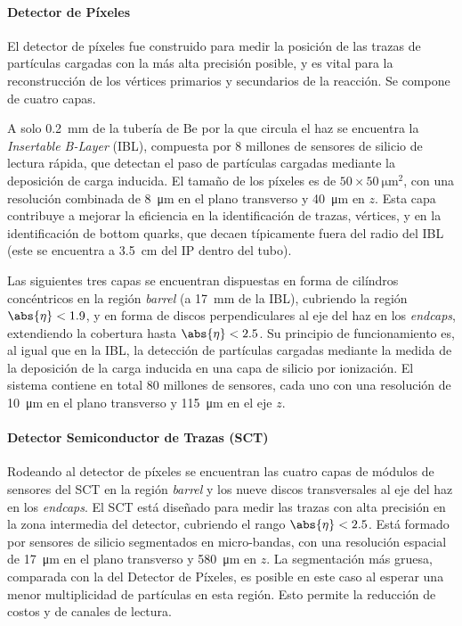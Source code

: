\paragraph{Detector de Píxeles}

El detector de píxeles fue construido para medir la posición de las trazas de partículas cargadas con la más alta precisión posible, y es vital para la reconstrucción de los vértices primarios y secundarios de la reacción. Se compone de cuatro capas.

A solo \SI{0.2}{\milli\meter} de la tubería de $\textrm{Be}$ por la que circula el haz se encuentra la \textit{Insertable B-Layer} (IBL), compuesta por 8 millones de sensores de silicio de lectura rápida, que detectan el paso de partículas cargadas mediante la deposición de carga inducida. El tamaño de los píxeles es de $50 \times \SI{50}{\micro\meter^2}$, con una resolución combinada de \SI{8}{\micro\meter} en el plano transverso y \SI{40}{\micro\meter} en $z$. Esta capa contribuye a mejorar la eficiencia en la identificación de trazas, vértices, y en la identificación de bottom quarks, que decaen típicamente fuera del radio del IBL (este se encuentra a \SI{3.5}{\centi\meter} del IP dentro del tubo).

Las siguientes tres capas se encuentran dispuestas en forma de cilíndros concéntricos en la región \textit{barrel} (a \SI{17}{\milli\meter} de la IBL), cubriendo la región $\abs{\eta} < 1.9$, y en forma de discos perpendiculares al eje del haz en los \textit{endcaps}, extendiendo la cobertura hasta $\abs{\eta} < 2.5$. Su principio de funcionamiento es, al igual que en la IBL, la detección de partículas cargadas mediante la medida de la deposición de la carga inducida en una capa de silicio por ionización. El sistema contiene en total 80 millones de sensores, cada uno con una resolución de \SI{10}{\micro\meter} en el plano transverso y \SI{115}{\micro\meter} en el eje $z$.

\paragraph{Detector Semiconductor de Trazas (SCT)}

Rodeando al detector de píxeles se encuentran las cuatro capas de módulos de sensores del SCT en la región \textit{barrel} y los nueve discos transversales al eje del haz en los \textit{endcaps}. El SCT está diseñado para medir las trazas con alta precisión en la zona intermedia del detector, cubriendo el rango $\abs{\eta} < 2.5$. Está formado por sensores de silicio segmentados en micro-bandas, con una resolución espacial de \SI{17}{\micro\meter} en el plano transverso y \SI{580}{\micro\meter} en $z$. La segmentación más gruesa, comparada con la del Detector de Píxeles, es posible en este caso al esperar una menor multiplicidad de partículas en esta región. Esto permite la reducción de costos y de canales de lectura.

